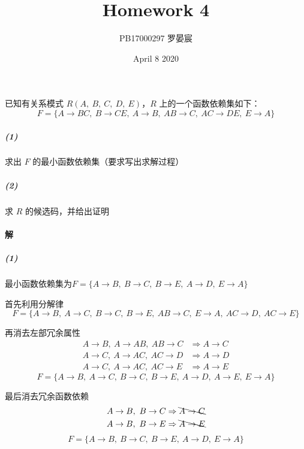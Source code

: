 \documentclass{article}
\title{Homework 4}
\author{PB17000297 罗晏宸}
\date{April 8 2020}
\makeatletter
\renewcommand{\section}{\@startsection{section}{1}{0mm}
                                {-5ex plus -.5ex minus -.2ex}
                                {3ex plus .2ex}
                                {\normalfont\large\bfseries}}
\makeatother
\begin{document}
\maketitle

\section{已知有关系模式 $R(A,\ B,\ C,\ D,\ E)$，$R$ 上的一个函数依赖集如下：$$F = \{ A \rightarrow BC,\ B \rightarrow CE,\ A \rightarrow B,\ AB \rightarrow C,\ AC \rightarrow DE,\ E \rightarrow A \}$$}
\subparagraph{(1)} 求出 $F$ 的最小函数依赖集（要求写出求解过程）
\subparagraph{(2)} 求 $R$ 的候选码，并给出证明

\paragraph{解}
\subparagraph{(1)}
最小函数依赖集为$F = \{A \rightarrow B,\ B \rightarrow C,\ B \rightarrow E,\ A \rightarrow D,\ E \rightarrow A\}$
\par
首先利用分解律
\begin{equation*}
    F = \{A \rightarrow B,\ A \rightarrow C,\ B \rightarrow C,\ B \rightarrow E,\ AB \rightarrow C,\ E \rightarrow A,\ AC \rightarrow D,\ AC \rightarrow E\}
\end{equation*}
\par
再消去左部冗余属性
\begin{align*}
    A \rightarrow B,\ A \rightarrow AB,\ AB \rightarrow C & \Rightarrow A \rightarrow C \\
    A \rightarrow C,\ A \rightarrow AC,\ AC \rightarrow D & \Rightarrow A \rightarrow D \\
    A \rightarrow C,\ A \rightarrow AC,\ AC \rightarrow E & \Rightarrow A \rightarrow E
\end{align*}
\begin{equation*}
    F = \{A \rightarrow B,\ A \rightarrow C,\ B \rightarrow C,\ B \rightarrow E,\ A \rightarrow D,\ A \rightarrow E,\ E \rightarrow A\}
\end{equation*}
\par
最后消去冗余函数依赖
\begin{align*}
    A \rightarrow B,\ B \rightarrow C & \Rightarrow \bcancel{A \rightarrow C} \\
    A \rightarrow B,\ B \rightarrow E & \Rightarrow \bcancel{A \rightarrow E}
\end{align*}
\begin{equation*}
    F = \{A \rightarrow B,\ B \rightarrow C,\ B \rightarrow E,\ A \rightarrow D,\ E \rightarrow A\}
\end{equation*}
\end{document}
